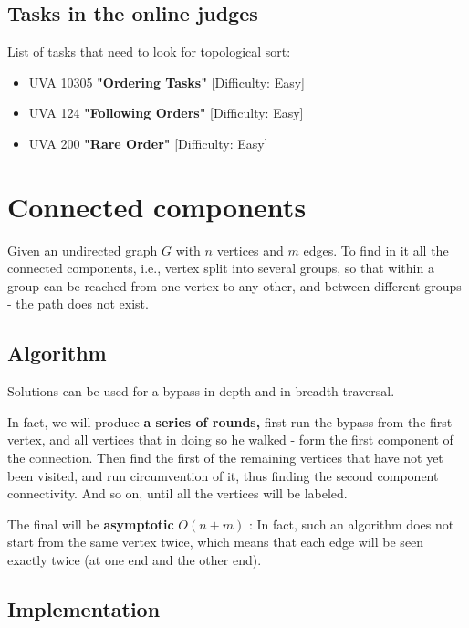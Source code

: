 \subsection{ Tasks in the online judges }

List of tasks that need to look for topological sort:

\begin{itemize}

\item UVA 10305 \textbf{"Ordering Tasks"} [Difficulty: Easy]

\item UVA 124 \textbf{"Following Orders"} [Difficulty: Easy]

\item UVA 200 \textbf{"Rare Order"} [Difficulty: Easy]

\end{itemize}

\section{ Connected components }
Given an undirected graph $G$ with $n$ vertices and $m$ edges. To find in it all the connected components, i.e., vertex split into several groups, so that within a group can be reached from one vertex to any other, and between different groups - the path does not exist.

\subsection{ Algorithm }

Solutions can be used for a bypass in depth and in breadth traversal.

In fact, we will produce \textbf{a series of rounds,} first run the bypass from the first vertex, and all vertices that in doing so he walked - form the first component of the connection. Then find the first of the remaining vertices that have not yet been visited, and run circumvention of it, thus finding the second component connectivity. And so on, until all the vertices will be labeled.

The final will be \textbf{asymptotic} $O (n + m)$ : In fact, such an algorithm does not start from the same vertex twice, which means that each edge will be seen exactly twice (at one end and the other end).

\subsection{ Implementation }

